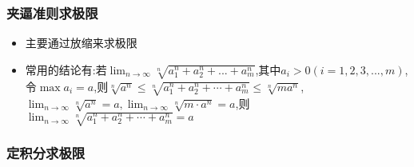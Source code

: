 \documentclass[12pt, a4paper, oneside, UTF8]{ctexbook}  %
\begin{document}
\subsubsection{夹逼准则求极限}
\begin{itemize}
    \item 主要通过放缩来求极限
    \item 常用的结论有:若$\lim _{n \to \infty} \sqrt[n]{a_1^n+a_2^n+...+a_m^n}$,其中$a_i >0(i=1,2,3,...,m)$,令$\max{a_i}=a$,则$\sqrt[n]{a^n}\leqslant\sqrt[n]{a_1^n+a_2^n+\cdots+a_m^n}\leqslant\sqrt[n]{ma^n}$,\\$\lim_{n\to\infty}\sqrt[n]{a^n}=a,\lim_{n\to\infty}\sqrt[n]{m\cdot a^n}=a$,则$\operatorname*{lim}_{n\to\infty}\sqrt[n]{a_1^n+a_2^n+\cdots+a_m^n}=a$
\end{itemize}

\subsubsection{定积分求极限}

\ifx\allfiles\undefined
\end{document}

